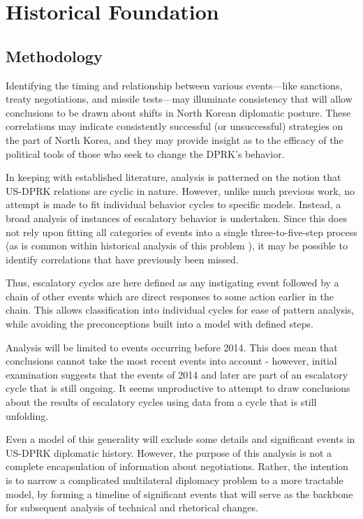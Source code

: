 \chapter{Historical Foundation}
\section{Methodology}

Identifying the timing and relationship between various events---like sanctions, treaty negotiations, and missile tests---may illuminate consistency that will allow conclusions to be drawn about shifts in North Korean diplomatic posture. These correlations may indicate consistently successful (or unsuccessful) strategies on the part of North Korea, and they may provide insight as to the efficacy of the political tools of those who seek to change the DPRK's behavior.

In keeping with established literature, analysis is patterned on the notion that US-DPRK relations are cyclic in nature. However, unlike much previous work, no attempt is made to fit individual behavior cycles to specific models. Instead, a broad analysis of instances of escalatory behavior is undertaken. Since this does not rely upon fitting all categories of events into a single three-to-five-step process (as is common within historical analysis of this problem \cite{fisher, jun}), it may be possible to identify correlations that have previously been missed.

Thus, escalatory cycles are here defined as any instigating event followed by a chain of other events which are direct responses to some action earlier in the chain. This allows classification into individual cycles for ease of pattern analysis, while avoiding the preconceptions built into a model with defined steps.

Analysis will be limited to events occurring before 2014. This does mean that conclusions cannot take the most recent events into account - however, initial examination suggests that the events of 2014 and later are part of an escalatory cycle that is still ongoing. It seems unproductive to attempt to draw conclusions about the results of escalatory cycles using data from a cycle that is still unfolding.

Even a model of this generality will exclude some details and significant events in US-DPRK diplomatic history. However, the purpose of this analysis is not a complete encapsulation of information about negotiations. Rather, the intention is to narrow a complicated multilateral diplomacy problem to a more tractable model, by forming a timeline of significant events that will serve as the backbone for subsequent analysis of technical and rhetorical changes.

